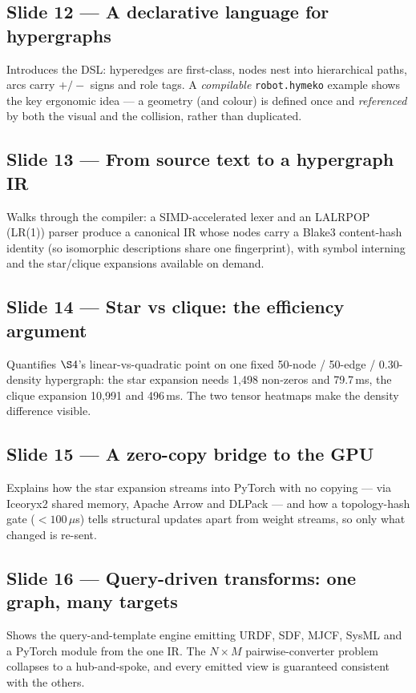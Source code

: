 \documentclass[10pt]{article}
\begin{document}
\subsection*{Slide 12 --- A declarative language for hypergraphs}
Introduces the DSL: hyperedges are first-class, nodes nest into hierarchical paths, arcs carry $+/-$ signs and role tags. A \emph{compilable} \texttt{robot.hymeko} example shows the key ergonomic idea --- a geometry (and colour) is defined once and \emph{referenced} by both the visual and the collision, rather than duplicated.

\subsection*{Slide 13 --- From source text to a hypergraph IR}
Walks through the compiler: a SIMD-accelerated lexer and an LALRPOP (LR(1)) parser produce a canonical IR whose nodes carry a Blake3 content-hash identity (so isomorphic descriptions share one fingerprint), with symbol interning and the star/clique expansions available on demand.

\subsection*{Slide 14 --- Star vs clique: the efficiency argument}
Quantifies $\S4$'s linear-vs-quadratic point on one fixed 50-node / 50-edge / 0.30-density hypergraph: the star expansion needs 1{,}498 non-zeros and 79.7\,ms, the clique expansion 10{,}991 and 496\,ms. The two tensor heatmaps make the density difference visible.

\subsection*{Slide 15 --- A zero-copy bridge to the GPU}
Explains how the star expansion streams into PyTorch with no copying --- via Iceoryx2 shared memory, Apache Arrow and DLPack --- and how a topology-hash gate ($<100\,\mu$s) tells structural updates apart from weight streams, so only what changed is re-sent.

\subsection*{Slide 16 --- Query-driven transforms: one graph, many targets}
Shows the query-and-template engine emitting URDF, SDF, MJCF, SysML and a PyTorch module from the one IR. The $N\times M$ pairwise-converter problem collapses to a hub-and-spoke, and every emitted view is guaranteed consistent with the others.
\end{document}
